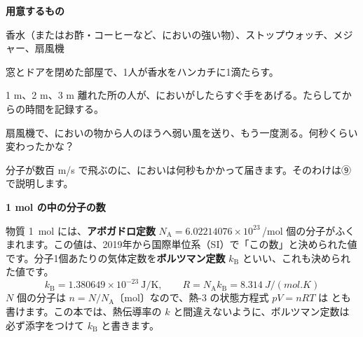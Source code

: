 \begin{yattemiyou}
\textbf{用意するもの}\par
香水（またはお酢・コーヒーなど、においの強い物）、ストップウォッチ、メジャー、扇風機
\begin{enumerate}[label={\bkcircled[bkGreen]{\arabic*}}, leftmargin=2.4\zw, itemsep=1pt, topsep=2pt]
\item 窓とドアを閉めた部屋で、1人が香水をハンカチに1滴たらす。
\item 1 m、2 m、3 m 離れた所の人が、においがしたらすぐ手をあげる。たらしてからの時間を記録する。
\item 扇風機で、においの物から人のほうへ弱い風を送り、もう一度測る。何秒くらい変わったかな？
\end{enumerate}
\end{yattemiyou}

\noindent 分子が数百 m/s で飛ぶのに、においは何秒もかかって届きます。そのわけは⑨で説明します。

\begin{omoidasou}
\end{omoidasou}



\leavevmode\label{ph:熱-14:sec1}\noindent\textbf{1 mol の中の分子の数}\par\nobreak
物質 \qty{1}{mol} には、\textbf{アボガドロ定数} $N_{\mathrm A}=6.02214076\times10^{23}$\,/mol 個の分子がふくまれます。この値は、2019年から国際単位系（SI）で「この数」と決められた値です。分子1個あたりの気体定数を\textbf{ボルツマン定数} $k_{\mathrm B}$ といい、これも決められた値です。
\[ k_{\mathrm B}=1.380649\times10^{-23}\ \mathrm{J/K},\qquad R=N_{\mathrm A}k_{\mathrm B}=\qty{8.314}{J/(mol.K)} \]
$N$ 個の分子は $n=N/N_{\mathrm A}$〔mol〕なので、熱-3 の状態方程式 $pV=nRT$ は
とも書けます。この本では、熱伝導率の $k$ と間違えないように、ボルツマン定数は必ず添字をつけて $k_{\mathrm B}$ と書きます。


